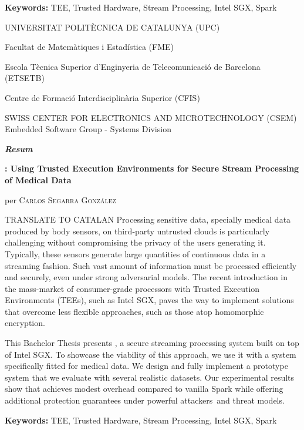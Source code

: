 \vspace{0.5cm}

\textbf{Keywords:} TEE, Trusted Hardware, Stream Processing, Intel SGX, Spark

\vfill
\pagebreak

\vspace*{0.5cm}
\begin{center}
    \large
    UNIVERSITAT POLIT\`ECNICA DE CATALUNYA (UPC) 

    \normalsize
    Facultat de Matem\`atiques i Estad\'istica (FME)

    Escola T\`ecnica Superior d'Enginyeria de Telecomunicaci\'o de Barcelona (ETSETB)

    Centre de Formaci\'o Interdisciplin\`aria Superior (CFIS)

    \vspace{0.5cm}

    \large
    SWISS CENTER FOR ELECTRONICS AND MICROTECHNOLOGY (CSEM)
    \normalsize
    Embedded Software Group - Systems Division
    
    \vspace{0.5cm}

    \LARGE
    \textit{\textbf{Resum}} 

    \vspace{0.5cm}

    \large
    \textbf{\projName: Using Trusted Execution Environments for Secure Stream Processing of Medical Data}

    per \textsc{Carlos Segarra Gonz\'alez}
\end{center}

\vspace{0.5cm}

\normalsize
TRANSLATE TO CATALAN %
Processing sensitive data, specially medical data produced by body sensors, on third-party untrusted clouds is particularly challenging without compromising the privacy of the users generating it. Typically, these sensors generate large quantities of continuous data in a streaming fashion. Such vast amount of information must be processed efficiently and securely, even under strong adversarial models. The recent introduction in the mass-market of consumer-grade processors with Trusted Execution Environments (TEEs), such as Intel SGX, paves the way to implement solutions that overcome less flexible approaches, such as those atop homomorphic encryption. 
    
This Bachelor Thesis presents \projName, a secure streaming processing system built on top of Intel SGX. To showcase the viability of this approach, we use it with a system specifically fitted for medical data. We design and fully implement a prototype system that we evaluate with several realistic datasets. Our experimental results show that \projName achieves modest overhead compared to vanilla Spark while offering additional protection guarantees under powerful attackers and threat models.

\vspace{0.5cm}

\textbf{Keywords:} TEE, Trusted Hardware, Stream Processing, Intel SGX, Spark

\vfill
